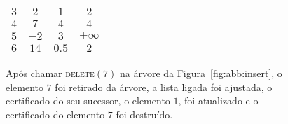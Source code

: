 \begin{figure}[H]
\begin{tabular}{|c|c|c|c|c|}
        $3$ & $2$   & $1$   & $2$                         \\

        $4$ & $7$   & $4$   & $4$                         \\

        $5$ & $-2$  & $3$   & $+\infty$                   \\

        $6$ & $14$  & $0.5$ & $2$                         \\
        \hline
    \end{tabular}
    \caption[ABB após chamar \textsc{delete}]{Após chamar
        {\normalfont \textsc{delete}$(7)$} na árvore da Figura~\ref{fig:abb:insert}, o
    elemento $7$ foi retirado da árvore, a lista ligada foi
    ajustada, o certificado do seu sucessor, o elemento $1$, foi
    atualizado e o certificado do elemento $7$ foi destruído.}
    \label{fig:abb:delete}
\end{figure}